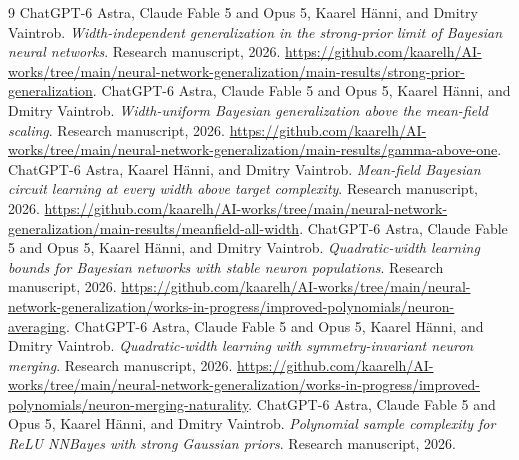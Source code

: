 \documentclass[11pt]{article}
\theoremstyle{remark}\newtheorem{remark}[theorem]{Remark}
\begin{document}
\begin{thebibliography}{9}
 ChatGPT-6 Astra, Claude Fable 5 and Opus 5, Kaarel H\"anni,
and Dmitry Vaintrob. \emph{Width-independent generalization in the
strong-prior limit of Bayesian neural networks}.
Research manuscript, 2026.
\url{https://github.com/kaarelh/AI-works/tree/main/neural-network-generalization/main-results/strong-prior-generalization}.
 ChatGPT-6 Astra, Claude Fable 5 and Opus 5, Kaarel H\"anni,
and Dmitry Vaintrob. \emph{Width-uniform Bayesian generalization above the
mean-field scaling}. Research manuscript, 2026.
\url{https://github.com/kaarelh/AI-works/tree/main/neural-network-generalization/main-results/gamma-above-one}.
 ChatGPT-6 Astra, Kaarel H\"anni, and Dmitry Vaintrob.
\emph{Mean-field Bayesian circuit learning at every width above target
complexity}. Research manuscript, 2026.
\url{https://github.com/kaarelh/AI-works/tree/main/neural-network-generalization/main-results/meanfield-all-width}.
 ChatGPT-6 Astra, Claude Fable 5 and Opus 5, Kaarel H\"anni,
and Dmitry Vaintrob. \emph{Quadratic-width learning bounds for Bayesian
networks with stable neuron populations}. Research manuscript, 2026.
\url{https://github.com/kaarelh/AI-works/tree/main/neural-network-generalization/works-in-progress/improved-polynomials/neuron-averaging}.
 ChatGPT-6 Astra, Claude Fable 5 and Opus 5, Kaarel H\"anni,
and Dmitry Vaintrob. \emph{Quadratic-width learning with symmetry-invariant
neuron merging}. Research manuscript, 2026.
\url{https://github.com/kaarelh/AI-works/tree/main/neural-network-generalization/works-in-progress/improved-polynomials/neuron-merging-naturality}.
 ChatGPT-6 Astra, Claude Fable 5 and Opus 5, Kaarel H\"anni,
and Dmitry Vaintrob. \emph{Polynomial sample complexity for ReLU NNBayes
with strong Gaussian priors}. Research manuscript, 2026.
\end{thebibliography}
\end{document}

